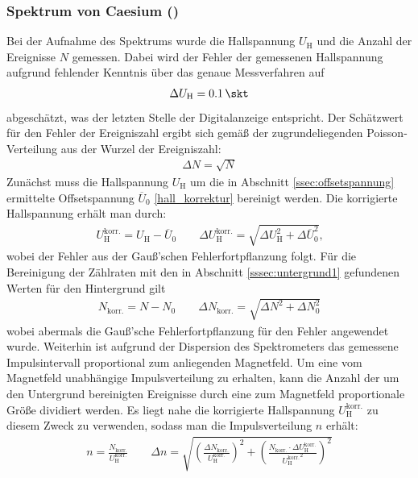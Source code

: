 \documentclass[11pt, a4paper]{article}
\numberwithin{equation}{section}
\begin{document}
\subsubsection{Spektrum von Caesium ()}
\label{sssec:spektrum_caesium}
Bei der Aufnahme des Spektrums wurde die Hallspannung $U_\mathrm{H}$ und die Anzahl der Ereignisse $N$ gemessen.
Dabei wird der Fehler der gemessenen Hallspannung aufgrund fehlender Kenntnis über das genaue Messverfahren auf
\begin{align*}
	\Delta U_\mathrm{H} = \SI{0.1}{\skt}
\end{align*}
abgeschätzt, was der letzten Stelle der Digitalanzeige entspricht.
Der Schätzwert für den Fehler der Ereigniszahl ergibt sich gemäß der zugrundeliegenden Poisson-Verteilung aus der Wurzel der Ereigniszahl:
\begin{align}
	\Delta N = \sqrt{N}
\end{align}
Zunächst muss die Hallspannung $U_\mathrm{H}$ um die in Abschnitt \ref{ssec:offsetspannung} ermittelte Offsetspannung $\overline{U}_0$ \eqref{hall_korrektur} bereinigt werden.
Die korrigierte Hallspannung erhält man durch:
\begin{align}
U_\mathrm{H}^\mathrm{korr.} = U_\mathrm{H} - \overline{U}_0 \qquad
\Delta U_\mathrm{H}^\mathrm{korr.} = \sqrt{\Delta U_\mathrm{H}^2 + \Delta \overline{U}_0^2} \text{,}
\end{align}
wobei der Fehler aus der Gauß'schen Fehlerfortpflanzung folgt.
Für die Bereinigung der Zählraten mit den in Abschnitt \ref{sssec:untergrund1} gefundenen Werten für den Hintergrund gilt
\begin{align}
	N_\mathrm{korr.} = N - N_0 \qquad \Delta N_\mathrm{korr.} = \sqrt{\Delta N^2 + \Delta N_0^2}
\end{align}
wobei abermals die Gauß'sche Fehlerfortpflanzung für den Fehler angewendet wurde.
Weiterhin ist aufgrund der Dispersion des Spektrometers das gemessene Impulsintervall proportional zum anliegenden Magnetfeld.
Um eine vom Magnetfeld unabhängige Impulsverteilung zu erhalten, kann die Anzahl der um den Untergrund bereinigten Ereignisse durch eine zum Magnetfeld proportionale Größe dividiert werden.
Es liegt nahe die korrigierte Hallspannung $U_\mathrm{H}^\mathrm{korr.}$ zu diesem Zweck zu verwenden, sodass man die Impulsverteilung $n$ erhält:
\begin{align}
	n = \frac{N_\mathrm{korr.}}{U_\mathrm{H}^\mathrm{korr.}} \qquad \Delta n = \sqrt{\left( \frac{\Delta N_\mathrm{korr.}}{U_\mathrm{H}^\mathrm{korr.}}\right)^2 + \left( \frac{N_\mathrm{korr.} \cdot \Delta U_\mathrm{H}^\mathrm{korr.}}{ {U_\mathrm{H}^\mathrm{korr.}}^2 }\right)^2}
\end{align}
\end{document}
